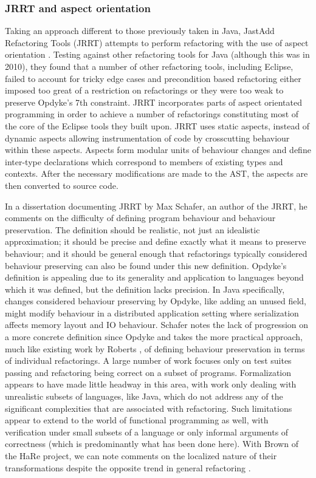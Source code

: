 \subsubsection{JRRT and aspect orientation}
Taking an approach different to those previously taken in Java, JastAdd Refactoring Tools (JRRT) attempts to perform refactoring with the use of aspect orientation \cite{schafer2010specification}. Testing against other refactoring tools for Java (although this was in 2010), they found that a number of other refactoring tools, including Eclipse, failed to account for tricky edge cases and precondition based refactoring either imposed too great of a restriction on refactorings or they were too weak to preserve Opdyke's 7th constraint. JRRT incorporates parts of aspect orientated programming in order to achieve a number of refactorings constituting most of the core of the Eclipse tools they built upon. JRRT uses static aspects, instead of dynamic aspects allowing instrumentation of code by crosscutting behaviour within these aspects. Aspects form modular units of behaviour changes and define inter-type declarations which correspond to members of existing types and contexts. After the necessary modifications are made to the AST, the aspects are then converted to source code.

In a dissertation documenting JRRT by Max Schafer, an author of the JRRT, he comments on the difficulty of defining program behaviour and behaviour preservation. The definition should be realistic, not just an idealistic approximation; it should be precise and define exactly what it means to preserve behaviour; and it should be general enough that refactorings typically considered behaviour preserving can also be found under this new definition. Opdyke's definition is appealing due to its generality and application to languages beyond which it was defined, but the definition lacks precision. In Java specifically, changes considered behaviour preserving by Opdyke, like adding an unused field, might modify behaviour in a distributed application setting where serialization affects memory layout and IO behaviour. Schafer notes the lack of progression on a more concrete definition since Opdyke and takes the more practical approach, much like existing work by Roberts \cite[p. 111]{schafer2010specification}, of defining behaviour preservation in terms of individual refactorings. A large number of work focuses only on test suites passing and refactoring being correct on a subset of programs. Formalization appears to have made little headway in this area, with work only dealing with unrealistic subsets of languages, like Java, which do not address any of the significant complexities that are associated with refactoring. Such limitations appear to extend to the world of functional programming as well, with verification under small subsets of a language or only informal arguments of correctness (which is predominantly what has been done here). With Brown of the HaRe project, we can note comments on the localized nature of their transformations despite the opposite trend in general refactoring \cite{brown2008tool}.

